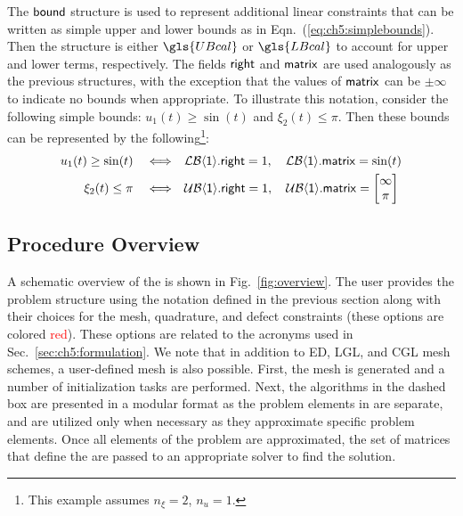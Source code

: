 The $\textup{\textsf{bound}}$ structure is used to represent additional linear constraints that can be written as simple upper and lower bounds as in Eqn.~(\ref{eq:ch5:simplebounds}).
Then the structure is either $\gls{UBcal}$ or $\gls{LBcal}$ to account for upper and lower terms, respectively.
The fields $\textup{\textsf{right}}$ and $\textup{\textsf{matrix}}$ are used analogously as the previous structures, with the exception that the values of $\textup{\textsf{matrix}}$ can be $\pm \infty$ to indicate no bounds when appropriate.
To illustrate this notation, consider the following simple bounds: $u_1(t) \geq \sin(t)$ and $\xi_2(t) \leq \pi$.
Then these bounds can be represented by the following\footnote{This example assumes $n_{\xi}=2$, $n_u=1$.}:%
\begin{subequations}%
\begin{align}
u_1(t) \geq \sin(t) \quad \Longleftrightarrow& \quad \mathcal{LB}\textup{\textsf{$\langle${1}$\rangle$.right}} = 1, \quad \mathcal{LB}\textup{\textsf{$\langle${1}$\rangle$.matrix}} = \sin(t) \\
\xi_2(t) \leq \pi \quad \Longleftrightarrow& \quad \mathcal{UB}\textup{\textsf{$\langle${1}$\rangle$.right}} = 1, \quad \mathcal{UB}\textup{\textsf{$\langle${1}$\rangle$.matrix}} = \begin{bmatrix} \infty \\ \pi \end{bmatrix}
\end{align}
\end{subequations}%

\subsection{Procedure Overview}

A schematic overview of the \apgp{} is shown in Fig.~\ref{fig:overview}.
The user provides the problem structure using the notation defined in the previous section along with their choices for the mesh, quadrature, and defect constraints (these options are colored \textcolor{red}{red}).
These options are related to the acronyms used in Sec.~\ref{sec:ch5:formulation}.
We note that in addition to ED, LGL, and CGL mesh schemes, a user-defined mesh is also possible.
First, the mesh is generated and a number of initialization tasks are performed.
Next, the algorithms in the dashed box are presented in a modular format as the problem elements in \lqdo{} are separate, and are utilized only when necessary as they approximate specific problem elements.
Once all elements of the problem are approximated, the set of matrices that define the \qp{} are passed to an appropriate \qp{} solver to find the solution.


